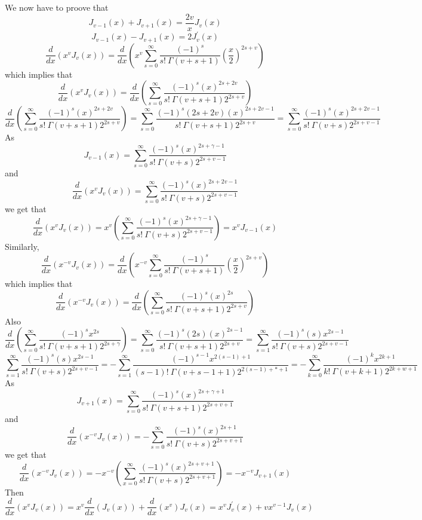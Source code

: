 \documentclass{article}
\begin{document}
\begin{flushleft}
We now have to proove that
$$J_{v-1}(x)+J_{v+1}(x)=\frac{2 v}{x} J_{v}(x)$$
$$J_{v-1}(x)-J_{v+1}(x)=2 J_{v}^{\prime}(x)$$
$$\frac{d}{d x}\left(x^{v} J_{v}(x)\right)=\frac{d}{d x}\left(x^{v} \sum_{s=0}^{\infty} \frac{(-1)^{s}}{s ! \  \Gamma(v+s+1)}\left(\frac{x}{2}\right)^{2 s+v}\right)$$
which implies that
$$
\frac{d}{d x}\left(x^{v} J_{v}(x)\right)=\frac{d}{d x}\left(\sum_{s=0}^{\infty} \frac{(-1)^{s}(x)^{2 s+2 v}}{s ! \  \Gamma(v+s+1) 2^{2 s+v}}\right)
$$
$$
\frac{d}{d x}\left(\sum_{s=0}^{\infty} \frac{(-1)^{s}(x)^{2 s+2 v}}{s ! \  \Gamma(v+s+1) 2^{2 s+v}}\right)=\sum_{s=0}^{\infty} \frac{(-1)^{s}(2 s+2 v)(x)^{2 s+2 v-1}}{s ! \  \Gamma(v+s+1) 2^{2 s+v}}=\sum_{s=0}^{\infty} \frac{(-1)^{s}(x)^{2 s+2 v-1}}{s ! \  \Gamma(v+s) 2^{2 s+v-1}}
$$
As 
$$J_{v-1}(x)=\sum_{s=0}^{\infty} \frac{(-1)^{s}(x)^{2 s+\gamma-1}}{s ! \  \Gamma(v+s) 2^{2 s+v-1}}$$
and
$$
\frac{d}{d x}\left(x^{v} J_{v}(x)\right)=\sum_{s=0}^{\infty} \frac{(-1)^{s}(x)^{2 s+2 v-1}}{s ! \  \Gamma(v+s) 2^{2 s+v-1}}
$$
we get that
$$
\frac{d}{d x}\left(x^{v} J_{v}(x)\right)=x^{v}\left(\sum_{s=0}^{\infty} \frac{(-1)^{s}(x)^{2 s+\gamma-1}}{s ! \  \Gamma(v+s) 2^{2 s+v-1}}\right)=x^{v} J_{v-1}(x)
$$
Similarly, 
$$
\frac{d}{d x}\left(x^{-v} J_{v}(x)\right)=\frac{d}{d x}\left(x^{-v} \sum_{s=0}^{\infty} \frac{(-1)^{s}}{s ! \  \Gamma(v+s+1)}\left(\frac{x}{2}\right)^{2 s+v}\right)
$$
which implies that
$$
\frac{d}{d x}\left(x^{-v} J_{v}(x)\right)=\frac{d}{d x}\left(\sum_{s=0}^{\infty} \frac{(-1)^{s}(x)^{2 s}}{s ! \  \Gamma(v+s+1) 2^{2 s+v}}\right)
$$
Also
$$
\frac{d}{d x}\left(\sum_{s=0}^{\infty} \frac{(-1)^{s} x^{2 s}}{s ! \  \Gamma(v+s+1) 2^{2 s+\gamma}}\right)=\sum_{s=0}^{\infty} \frac{(-1)^{s}(2 s)(x)^{2 s-1}}{s ! \  \Gamma(v+s+1) 2^{2 s+v}}=\sum_{s=1}^{\infty} \frac{(-1)^{s}(s) x^{2 s-1}}{s ! \  \Gamma(v+s) 2^{2 s+v-1}}
$$
$$
\sum_{s=1}^{\infty} \frac{(-1)^{s}(s) x^{2 s-1}}{s ! \  \Gamma(v+s) 2^{2 s+v-1}}=-\sum_{s=1}^{\infty} \frac{(-1)^{s-1} x^{2(s-1)+1}}{(s-1) ! \  \Gamma(v+s-1+1) 2^{2(s-1)+*+1}}=-\sum_{k=0}^{\infty} \frac{(-1)^{k} x^{2 k+1}}{k ! \  \Gamma(v+k+1) 2^{2 k+w+1}}
$$
As
$$
J_{v+1}(x)=\sum_{s=0}^{\infty} \frac{(-1)^{s}(x)^{2 s+\gamma+1}}{s ! \  \Gamma(v+s+1) 2^{2 s+v+1}}
$$
and
$$
\frac{d}{d x}\left(x^{-v} J_{v}(x)\right)=-\sum_{s=0}^{\infty} \frac{(-1)^{s}(x)^{2 s+1}}{s ! \  \Gamma(v+s) 2^{2 s+v+1}}
$$
we get that
$$
\frac{d}{d x}\left(x^{-v} J_{v}(x)\right)=-x^{-v}\left(\sum_{x=0}^{\infty} \frac{(-1)^{s}(x)^{2 s+v+1}}{s ! \  \Gamma(v+s) 2^{2 s+v+1}}\right)=-x^{-v} J_{v+1}(x)
$$
Then
$$
\frac{d}{d x}\left(x^{v} J_{v}(x)\right)=x^{v} \frac{d}{d x}\left(J_{v}(x)\right)+\frac{d}{d x}\left(x^{v}\right) J_{v}(x)=x^{v} J_{v}^{\prime}(x)+v x^{v-1} J_{v}(x)
$$
\end{flushleft}
\end{document}
